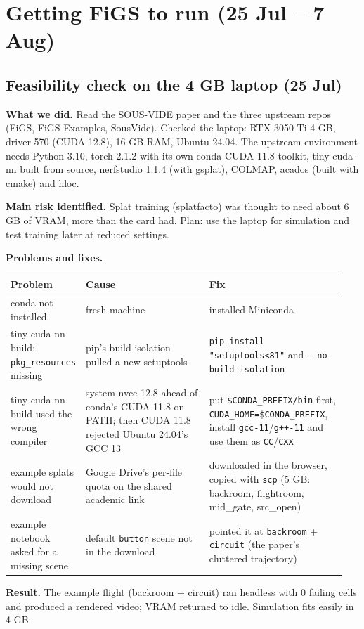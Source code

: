 \documentclass[11pt,a4paper]{article}
\newcommand{\code}[1]{\texttt{#1}}
\begin{document}
\section{Getting FiGS to run (25 Jul – 7 Aug)}
\subsection{Feasibility check on the 4 GB laptop (25 Jul)}
\textbf{What we did.} Read the SOUS-VIDE paper and the three upstream repos (FiGS, FiGS-Examples, SousVide). Checked the laptop: RTX 3050 Ti 4 GB, driver 570 (CUDA 12.8), 16 GB RAM, Ubuntu 24.04. The upstream environment needs Python 3.10, torch 2.1.2 with its own conda CUDA 11.8 toolkit, tiny-cuda-nn built from source, nerfstudio 1.1.4 (with gsplat), COLMAP, acados (built with cmake) and hloc.

\textbf{Main risk identified.} Splat training (splatfacto) was thought to need about 6 GB of VRAM, more than the card had. Plan: use the laptop for simulation and test training later at reduced settings.

\textbf{Problems and fixes.}

\begin{center}\small
\begin{tabular}{@{}>{\raggedright\arraybackslash}p{0.162\linewidth}>{\raggedright\arraybackslash}p{0.370\linewidth}>{\raggedright\arraybackslash}p{0.415\linewidth}@{}}
\toprule
\textbf{Problem} & \textbf{Cause} & \textbf{Fix} \\
\midrule
conda not installed & fresh machine & installed Miniconda \\
tiny-cuda-nn build: \code{pkg\_\allowbreak{}resources} missing & pip's build isolation pulled a new setuptools & \code{pip install "setuptools<81"} and \code{-{}-no-build-isolation} \\
tiny-cuda-nn build used the wrong compiler & system nvcc 12.8 ahead of conda's CUDA 11.8 on PATH; then CUDA 11.8 rejected Ubuntu 24.04's GCC 13 & put \code{\$CONDA\_\allowbreak{}PREFIX/\allowbreak{}bin} first, \code{CUDA\_\allowbreak{}HOME=\$CONDA\_\allowbreak{}PREFIX}, install \code{gcc-11}/\code{g++-11} and use them as \code{CC}/\code{CXX} \\
example splats would not download & Google Drive's per-file quota on the shared academic link & downloaded in the browser, copied with \code{scp} (5 GB: backroom, flightroom, mid\_gate, src\_open) \\
example notebook asked for a missing scene & default \code{button} scene not in the download & pointed it at \code{backroom} + \code{circuit} (the paper's cluttered trajectory) \\
\bottomrule
\end{tabular}
\end{center}
\textbf{Result.} The example flight (backroom + circuit) ran headless with 0 failing cells and produced a rendered video; VRAM returned to idle. Simulation fits easily in 4 GB.
\end{document}
